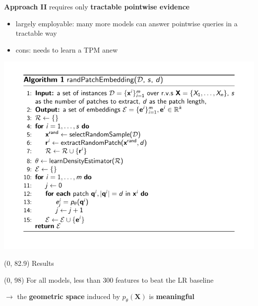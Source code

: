 \documentclass[final]{beamer}
\begin{document}
\begin{frame}{}
\begin{textblock}{25.2}
        \textbf{Approach II} requires only \textbf{tractable pointwise evidence}
        \begin{itemize}
        \item largely employable: many more models can answer pointwise
          queries in a tractable way
        \item cons: needs to learn a TPM anew  
        \end{itemize}
        \begin{center}
          \includegraphics[width=0.9\linewidth]{algo_II}
        \end{center}
      \end{textblock}

      

      

      
  
  \begin{textblock}{80}(0, 82.9)
    Results
  \end{textblock}
  
  \begin{textblock}{25.2}(0, 98)
    \small
    For all models, less than $300$ features to beat the \textsf{LR}
    baseline\par
    \hspace{15pt}$\rightarrow$ the \textbf{geometric space} induced by $p_{\theta}(\mathbf{X})$ is \textbf{meaningful}
  \end{textblock}
  

\end{frame}
\end{document}
